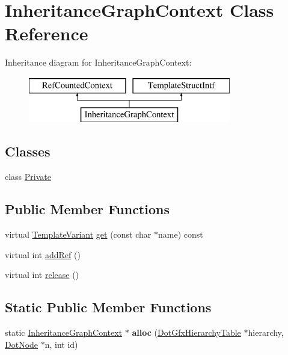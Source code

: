 \hypertarget{class_inheritance_graph_context}{}\section{Inheritance\+Graph\+Context Class Reference}
\label{class_inheritance_graph_context}
Inheritance diagram for Inheritance\+Graph\+Context\+:\begin{figure}[H]
\begin{center}
\leavevmode
\includegraphics[height=2.000000cm]{class_inheritance_graph_context}
\end{center}
\end{figure}
\subsection*{Classes}
\begin{DoxyCompactItemize}
\item 
class \mbox{\hyperlink{class_inheritance_graph_context_1_1_private}{Private}}
\end{DoxyCompactItemize}
\subsection*{Public Member Functions}
\begin{DoxyCompactItemize}
\item 
virtual \mbox{\hyperlink{class_template_variant}{Template\+Variant}} \mbox{\hyperlink{class_inheritance_graph_context_ace9c3bd9a2d01fb2f375e2796b8a8a07}{get}} (const char $\ast$name) const
\item 
virtual int \mbox{\hyperlink{class_inheritance_graph_context_a015d84370ad12f94eec44da91e59c631}{add\+Ref}} ()
\item 
virtual int \mbox{\hyperlink{class_inheritance_graph_context_ac793f53cb0f72b1b9e2f6920c2667c61}{release}} ()
\end{DoxyCompactItemize}
\subsection*{Static Public Member Functions}
\begin{DoxyCompactItemize}
\item 
\mbox{\label{class_inheritance_graph_context_a5635612a1c9609d0257ad999fc0b6dca}} 
static \mbox{\hyperlink{class_inheritance_graph_context}{Inheritance\+Graph\+Context}} $\ast$ {\bfseries alloc} (\mbox{\hyperlink{class_dot_gfx_hierarchy_table}{Dot\+Gfx\+Hierarchy\+Table}} $\ast$hierarchy, \mbox{\hyperlink{class_dot_node}{Dot\+Node}} $\ast$n, int id)
\end{DoxyCompactItemize}



